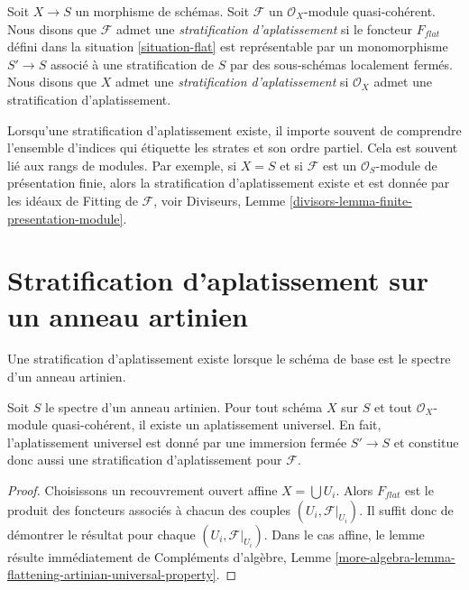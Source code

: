 \begin{definition}
\label{definition-flattening-stratification}
Soit $X \to S$ un morphisme de schémas.
Soit $\mathcal{F}$ un $\mathcal{O}_X$-module quasi-cohérent.
Nous disons que $\mathcal{F}$ admet une {\it stratification d'aplatissement}
si le foncteur $F_{flat}$ défini dans la situation \ref{situation-flat}
est représentable par un monomorphisme $S' \to S$ associé
à une stratification de $S$ par des sous-schémas localement fermés.
Nous disons que $X$ admet une {\it stratification d'aplatissement}
si $\mathcal{O}_X$ admet une stratification d'aplatissement.
\end{definition}

\noindent
Lorsqu'une stratification d'aplatissement existe, il importe souvent
de comprendre l'ensemble d'indices qui étiquette les strates et son ordre partiel.
Cela est souvent lié aux rangs de modules. Par exemple, si
$X = S$ et si $\mathcal{F}$ est un $\mathcal{O}_S$-module de présentation finie,
alors la stratification d'aplatissement existe et est donnée par les idéaux de Fitting
de $\mathcal{F}$, voir
Diviseurs, Lemme \ref{divisors-lemma-finite-presentation-module}.




\section{Stratification d'aplatissement sur un anneau artinien}
\label{section-flattening-artinian}

\noindent
Une stratification d'aplatissement existe lorsque le schéma de base est le spectre
d'un anneau artinien.

\begin{lemma}
\label{lemma-flattening-stratification-artinian}
Soit $S$ le spectre d'un anneau artinien.
Pour tout schéma $X$ sur $S$ et tout $\mathcal{O}_X$-module quasi-cohérent,
il existe un aplatissement universel. En fait, l'aplatissement universel
est donné par une immersion fermée $S' \to S$ et constitue donc aussi une
stratification d'aplatissement pour $\mathcal{F}$.
\end{lemma}

\begin{proof}
Choisissons un recouvrement ouvert affine $X = \bigcup U_i$.
Alors $F_{flat}$ est le produit des foncteurs associés à
chacun des couples $(U_i, \mathcal{F}|_{U_i})$.
Il suffit donc de démontrer le résultat pour chaque
$(U_i, \mathcal{F}|_{U_i})$.
Dans le cas affine, le lemme résulte immédiatement de
Compléments d'algèbre,
Lemme \ref{more-algebra-lemma-flattening-artinian-universal-property}.
\end{proof}






